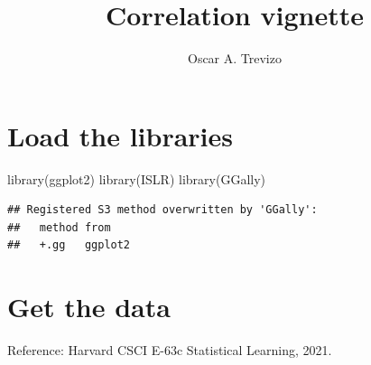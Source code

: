 \documentclass[
]{article}
\title{Correlation vignette}
\author{Oscar A. Trevizo}
\date{}
\newenvironment{Shaded}{\begin{snugshade}}{\end{snugshade}}
\newcommand{\AttributeTok}[1]{\textcolor[rgb]{0.77,0.63,0.00}{#1}}
\newcommand{\CommentTok}[1]{\textcolor[rgb]{0.56,0.35,0.01}{\textit{#1}}}
\newcommand{\ConstantTok}[1]{\textcolor[rgb]{0.00,0.00,0.00}{#1}}
\newcommand{\FunctionTok}[1]{\textcolor[rgb]{0.00,0.00,0.00}{#1}}
\newcommand{\NormalTok}[1]{#1}
\newcommand{\SpecialCharTok}[1]{\textcolor[rgb]{0.00,0.00,0.00}{#1}}
\begin{document}
\maketitle

{
\setcounter{tocdepth}{2}
\tableofcontents
}
\hypertarget{load-the-libraries}{%
\section{Load the libraries}\label{load-the-libraries}}

\begin{Shaded}
\begin{Highlighting}[]
\FunctionTok{library}\NormalTok{(ggplot2)}
\FunctionTok{library}\NormalTok{(ISLR)}
\FunctionTok{library}\NormalTok{(GGally)}
\end{Highlighting}
\end{Shaded}

\begin{verbatim}
## Registered S3 method overwritten by 'GGally':
##   method from   
##   +.gg   ggplot2
\end{verbatim}

\begin{Shaded}
\end{Shaded}

\hypertarget{get-the-data}{%
\section{Get the data}\label{get-the-data}}

Reference: Harvard CSCI E-63c Statistical Learning, 2021.
\end{document}
